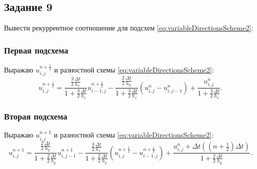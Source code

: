 \documentclass[12pt, a4paper]{report}
\begin{document}
	\subsection*{Задание 9}
	\large
	Вывести рекуррентное соотношение для подсхем \eqref{eq:variableDirectionsScheme2}: \par
	\subsubsection*{Первая подсхема}
	\large
	Выражаю $u_{i, j}^{n+\frac{1}{2}}$ и разностной схемы \eqref{eq:variableDirectionsScheme2}:
	\begin{equation*}
		u_{i, j}^{n+\frac{1}{2}} = \frac{\frac{3}{2}\frac{\Delta t}{h_{x}}}{1 + \frac{3}{2}\frac{\Delta t}{h_{x}}}u_{i-1, j}^{n+\frac{1}{2}} - \frac{\frac{2}{2}\frac{\Delta t}{h_{y}}}{1 + \frac{3}{2}\frac{\Delta t}{h_{x}}}(u_{i, j}^{n} - u_{i, j-1}^{n}) + \frac{u_{i, j}^{n}}{1 + \frac{3}{2}\frac{\Delta t}{h_{x}}}.
	\end{equation*}
	\subsubsection*{Вторая подсхема}
	\large
	Выражаю $u_{i, j}^{n+1}$ и разностной схемы \eqref{eq:variableDirectionsScheme2}:
	\begin{equation*}
		u_{i, j}^{n+1} = \frac{\frac{2}{2}\frac{\Delta t}{h_{y}}}{1 + \frac{2}{2}\frac{\Delta t}{h_{y}}}u_{i, j-1}^{n+1} - \frac{\frac{3}{2}\frac{\Delta t}{h_{x}}}{1 + \frac{2}{2}\frac{\Delta t}{h_{y}}}(u_{i, j}^{n+\frac{1}{2}} - u_{i-1, j}^{n+\frac{1}{2}}) + \frac{u_{i, j}^{n} + \Delta t((n+\frac{1}{2})\Delta t)}{1 + \frac{2}{2}\frac{\Delta t}{h_{y}}}.
	\end{equation*}
\end{document}
